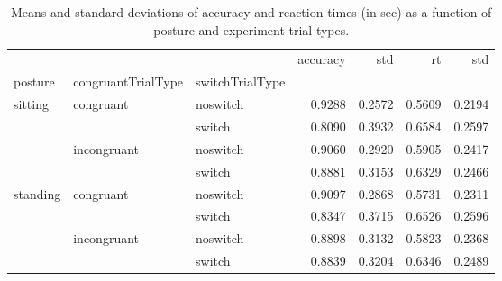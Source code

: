 \begin{table}
\centering
\caption{Means and standard deviations of accuracy and reaction times (in sec) as a function of posture and experiment trial types.}
\label{table-task-switching-replication-reaction-time}
\begin{tabular}{lllrrrr}
\toprule
         &             &        & accuracy &    std &     rt &    std \\
posture & congruantTrialType & switchTrialType &          &        &        &        \\
\midrule
sitting & congruant & noswitch &   0.9288 & 0.2572 & 0.5609 & 0.2194 \\
         &             & switch &   0.8090 & 0.3932 & 0.6584 & 0.2597 \\
         & incongruant & noswitch &   0.9060 & 0.2920 & 0.5905 & 0.2417 \\
         &             & switch &   0.8881 & 0.3153 & 0.6329 & 0.2466 \\
standing & congruant & noswitch &   0.9097 & 0.2868 & 0.5731 & 0.2311 \\
         &             & switch &   0.8347 & 0.3715 & 0.6526 & 0.2596 \\
         & incongruant & noswitch &   0.8898 & 0.3132 & 0.5823 & 0.2368 \\
         &             & switch &   0.8839 & 0.3204 & 0.6346 & 0.2489 \\
\bottomrule
\end{tabular}
\end{table}
